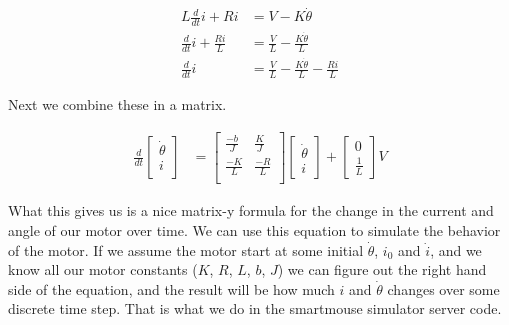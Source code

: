 \documentclass{article}
\begin{document}
\begin{align}
  L\frac{d}{dt}i + Ri &= V - K\dot{\theta} \\
  \frac{d}{dt}i + \frac{Ri}{L} &= \frac{V}{L} - \frac{K\dot{\theta}}{L} \\
  \frac{d}{dt}i &= \frac{V}{L} - \frac{K\dot{\theta}}{L} - \frac{Ri}{L}
\end{align}

Next we combine these in a matrix.

\begin{align}
  \frac{d}{dt}\begin{bmatrix}\dot{\theta}\\i\\\end{bmatrix} &=
    \begin{bmatrix}
      \frac{-b}{J} & \frac{K}{J} \\
      \frac{-K}{L} & \frac{-R}{L} \\
    \end{bmatrix}
    \begin{bmatrix}
      \dot{\theta} \\
      i
    \end{bmatrix}
    +
    \begin{bmatrix}
      0 \\
      \frac{1}{L}
    \end{bmatrix}
    V
\end{align}

What this gives us is a nice matrix-y formula for the change in the current and angle of our motor over time. We can use this equation to simulate the behavior of the motor. If we assume the motor start at some initial $\dot{\theta}$, $i_0$ and $\dot{i}$, and we know all our motor constants ($K$, $R$, $L$, $b$, $J$) we can figure out the right hand side of the equation, and the result will be how much $i$ and $\dot{\theta}$ changes over some discrete time step. That is what we do in the smartmouse simulator server code.
\end{document}
